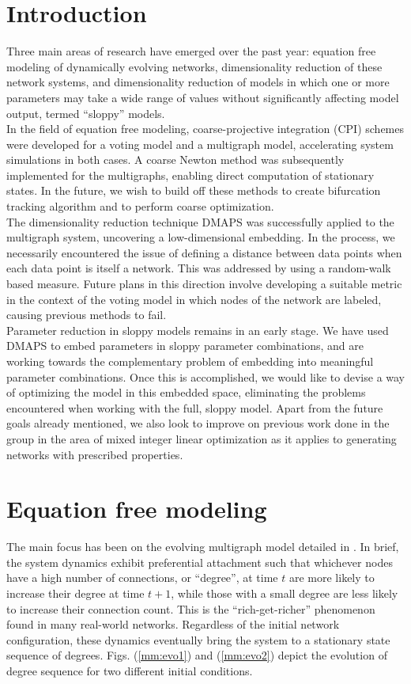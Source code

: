 \documentclass[12pt]{article}
\begin{document}
\begin{spacing}{2.2}
\section*{Introduction}
  Three main areas of research have emerged over the past year: equation free modeling of dynamically evolving networks, dimensionality reduction of these network systems, and dimensionality reduction of models in which one or more parameters may take a wide range of values without significantly affecting model output, termed ``sloppy'' models. \\
  In the field of equation free modeling, coarse-projective integration (CPI) schemes were developed for a voting model and a multigraph model, accelerating system simulations in both cases. A coarse Newton method was subsequently implemented for the multigraphs, enabling direct computation of stationary states. In the future, we wish to build off these methods to create bifurcation tracking algorithm and to perform coarse optimization. \\
  The dimensionality reduction technique DMAPS was successfully applied to the multigraph system, uncovering a low-dimensional embedding. In the process, we necessarily encountered the issue of defining a distance between data points when each data point is itself a network. This was addressed by using a random-walk based measure. Future plans in this direction involve developing a suitable metric in the context of the voting model in which nodes of the network are labeled, causing previous methods to fail. \\
  Parameter reduction in sloppy models remains in an early stage. We have used DMAPS to embed parameters in sloppy parameter combinations, and are working towards the complementary problem of embedding into meaningful parameter combinations. Once this is accomplished, we would like to devise a way of optimizing the model in this embedded space, eliminating the problems encountered when working with the full, sloppy model.
  Apart from the future goals already mentioned, we also look to improve on previous work done in the group in the area of mixed integer linear optimization as it applies to generating networks with prescribed properties.

\section*{Equation free modeling}
The main focus has been on the evolving multigraph model detailed in \cite{Rath2012}. In brief, the system dynamics exhibit preferential attachment such that whichever nodes have a high number of connections, or ``degree'', at time $t$ are more likely to increase their degree at time $t+1$, while those with a small degree are less likely to increase their connection count. This is the ``rich-get-richer'' phenomenon found in many real-world networks. Regardless of the initial network configuration, these dynamics eventually bring the system to a stationary state sequence of degrees. Figs. (\ref{mm:evo1}) and (\ref{mm:evo2}) depict the evolution of degree sequence for two different initial conditions. 

\end{spacing}
\end{document}
